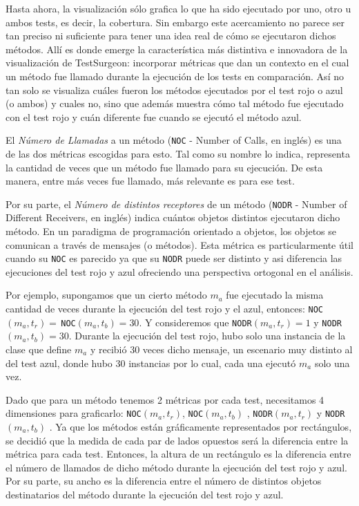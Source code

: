 \par Hasta ahora, la visualización sólo grafica lo que ha sido ejecutado por uno, otro u ambos tests, es decir, la cobertura. Sin embargo este acercamiento no parece ser tan preciso ni suficiente para tener una idea real de cómo se ejecutaron dichos métodos. Allí es donde emerge la característica más distintiva e innovadora de la visualización de TestSurgeon: incorporar métricas que dan un contexto en el cual un método fue llamado durante la ejecución de los tests en comparación. Así no tan solo se visualiza cuáles fueron los métodos ejecutados por el test rojo o azul (o ambos) y cuales no, sino que además muestra cómo tal método fue ejecutado con el test rojo y cuán diferente fue cuando se ejecutó el método azul.

\par El \emph{Número de Llamadas} a un método ({\tt NOC} - Number of Calls, en inglés) es una de las dos métricas escogidas para esto. Tal como su nombre lo indica, representa la cantidad de veces que un método fue llamado para su ejecución. De esta manera, entre más veces fue llamado, más relevante es para ese test.

\par Por su parte, el \emph{Número de distintos receptores} de un método ({\tt NODR} - Number of Different Receivers, en inglés) indica cuántos objetos distintos ejecutaron dicho método. En un paradigma de programación orientado a objetos, los objetos se comunican a través de mensajes (o métodos). Esta métrica es particularmente útil cuando su {\tt NOC} es parecido ya que su {\tt NODR} puede ser distinto y asi diferencia las ejecuciones del test rojo y azul ofreciendo una perspectiva ortogonal en el análisis.

\par Por ejemplo, supongamos que un cierto método $m_a$ fue ejecutado la misma cantidad de veces durante la ejecución del test rojo y el azul, entonces: {\tt NOC}$(m_a,t_r) = \,${\tt NOC}$(m_a,t_b) = 30$. Y consideremos que {\tt NODR}$(m_a,t_r) = 1$ y {\tt NODR}$(m_a,t_b) = 30$. Durante la ejecución del test rojo, hubo solo una instancia de la clase que define $m_a$ y recibió 30 veces dicho mensaje, un escenario muy distinto al del test azul, donde hubo 30 instancias por lo cual, cada una ejecutó $m_a$ solo una vez.

\par Dado que para un método tenemos 2 métricas por cada test, necesitamos 4 dimensiones para graficarlo: {\tt NOC}$(m_a,t_r)$, {\tt NOC}$(m_a,t_b)$ , {\tt NODR}$(m_a,t_r)$ y {\tt NODR}$(m_a,t_b)$ . Ya que los métodos están gráficamente representados por rectángulos, se decidió que la medida de cada par de lados opuestos será la diferencia entre la métrica para cada test. Entonces, la altura de un rectángulo es la diferencia entre el número de llamados de dicho método durante la ejecución del test rojo y azul. Por su parte, su ancho es la diferencia entre el número de distintos objetos destinatarios del método durante la ejecución del test rojo y azul. 

